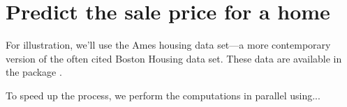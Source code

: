 \section{Predict the sale price for a home}

For illustration, we'll use the Ames housing data set---a more contemporary version of the often cited Boston Housing data set. These data are available in the  package
\citep{AmesHousing-pkg}. %

To speed up the process, we perform the computations in parallel using...

